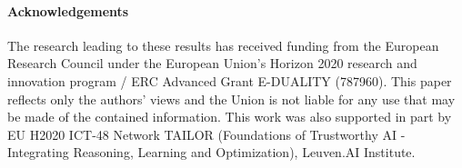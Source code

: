 \documentclass[final]{cvpr}
\begin{document}
\vspace{-2mm}
\paragraph{Acknowledgements} The research leading to these results has received funding from the European Research Council under the European Union's Horizon 2020 research and innovation program / ERC Advanced Grant E-DUALITY (787960).
This paper reflects only the authors' views and the Union is not liable for any use that may be made of the contained information. 
This work was also supported in part by 
EU H2020 ICT-48 Network TAILOR (Foundations of Trustworthy
AI - Integrating Reasoning, Learning and Optimization),
Leuven.AI Institute.






{\small


}
\end{document}
